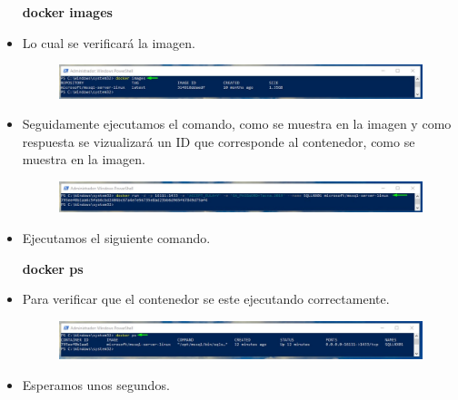 \begin{itemize}
					\begin{center}
						\textbf{docker images} \\
					\end{center}
				\item Lo cual se verificará la imagen.
					\begin{figure}[htb]
						\begin{center}
							\includegraphics[width=16cm]{./Imagenes/Comando04}
						\end{center}
					\end{figure}
				\item Seguidamente ejecutamos el comando, como se muestra en la imagen y como respuesta se vizualizará un ID que corresponde al contenedor, como se muestra en la imagen.
					\begin{figure}[htb]
						\begin{center}
							\includegraphics[width=16cm]{./Imagenes/Comando05}
						\end{center}
					\end{figure}
				\item Ejecutamos el siguiente comando.
					\begin{center}
						\textbf{docker ps} \\
					\end{center}
				\item Para verificar que el contenedor se este ejecutando correctamente.
					\begin{figure}[htb]
						\begin{center}
							\includegraphics[width=16cm]{./Imagenes/Comando06}
						\end{center}
					\end{figure}
					\vspace{6cm}
				\item Esperamos unos segundos.

\end{itemize}
